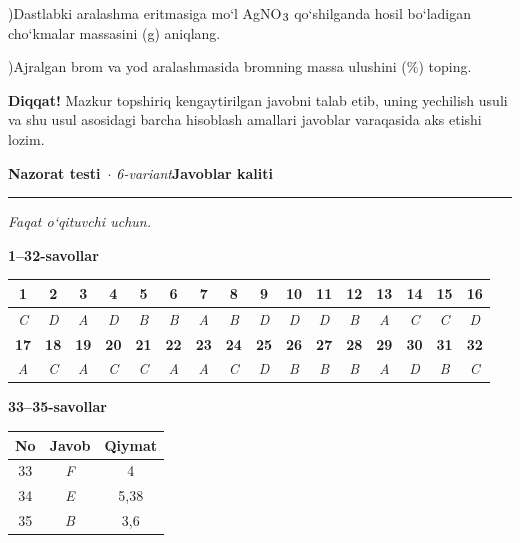 \documentclass[11pt,a4paper]{article}
\renewcommand{\textsubscript}[1]{\ensuremath{_{\text{\fontsize{8}{8}\selectfont #1}}}}
\newcommand{\diqqat}[1]{\par\smallskip\noindent\textbf{Diqqat!} #1\par\medskip}
\begin{document}
)Dastlabki aralashma eritmasiga mo`l AgNO\textsubscript{3} qo`shilganda hosil bo`ladigan cho`kmalar massasini (g) aniqlang.\par
{})Ajralgan brom va yod aralashmasida bromning massa ulushini (\%) toping.\par
\diqqat{Mazkur topshiriq kengaytirilgan javobni talab etib, uning yechilish usuli va shu usul asosidagi barcha hisoblash amallari javoblar varaqasida aks etishi lozim.}
\newpage
\noindent\textbf{\fontsize{13}{15}\selectfont Nazorat testi}\ \textit{$\cdot$ 6-variant}\hfill \textbf{Javoblar kaliti}\par\smallskip\hrule\smallskip
\textit{Faqat o`qituvchi uchun.}\par\medskip
\noindent\textbf{1--32-savollar}\par\smallskip
\noindent\begin{tabular}{|c|c|c|c|c|c|c|c|c|c|c|c|c|c|c|c|}\hline
\textbf{1} & \textbf{2} & \textbf{3} & \textbf{4} & \textbf{5} & \textbf{6} & \textbf{7} & \textbf{8} & \textbf{9} & \textbf{10} & \textbf{11} & \textbf{12} & \textbf{13} & \textbf{14} & \textbf{15} & \textbf{16}\\\hline
\textsl{C} & \textsl{D} & \textsl{A} & \textsl{D} & \textsl{B} & \textsl{B} & \textsl{A} & \textsl{B} & \textsl{D} & \textsl{D} & \textsl{D} & \textsl{B} & \textsl{A} & \textsl{C} & \textsl{C} & \textsl{D}\\\hline
\textbf{17} & \textbf{18} & \textbf{19} & \textbf{20} & \textbf{21} & \textbf{22} & \textbf{23} & \textbf{24} & \textbf{25} & \textbf{26} & \textbf{27} & \textbf{28} & \textbf{29} & \textbf{30} & \textbf{31} & \textbf{32}\\\hline
\textsl{A} & \textsl{C} & \textsl{A} & \textsl{C} & \textsl{C} & \textsl{A} & \textsl{A} & \textsl{C} & \textsl{D} & \textsl{B} & \textsl{B} & \textsl{B} & \textsl{A} & \textsl{D} & \textsl{B} & \textsl{C}\\\hline
\end{tabular}\par\medskip
\noindent\textbf{33--35-savollar}\par\smallskip
\noindent\begin{tabular}{|c|c|c|}\hline \textbf{No} & \textbf{Javob} & \textbf{Qiymat}\\\hline
33 & \textsl{F} & 4\\\hline
34 & \textsl{E} & 5,38\\\hline
35 & \textsl{B} & 3,6\\\hline
\end{tabular}\par\medskip
\end{document}
